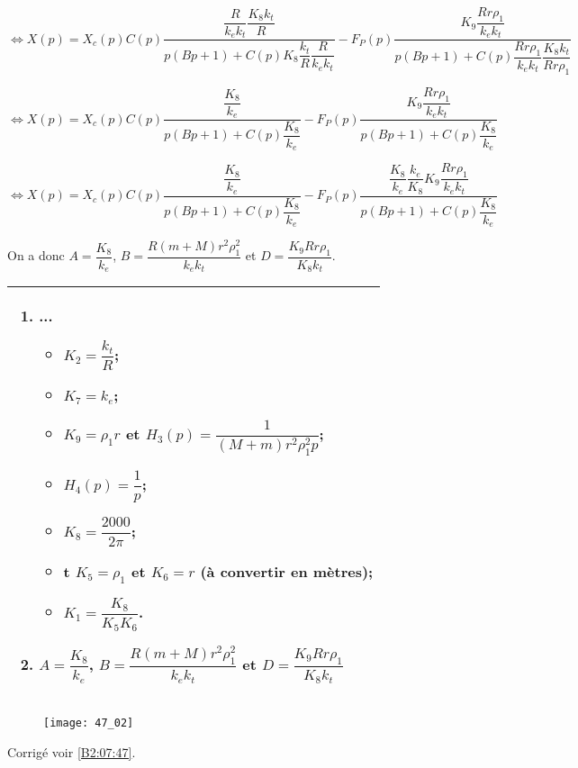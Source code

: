 $\Leftrightarrow X(p)
=
X_c(p) C(p)\dfrac{
\dfrac{R}{k_ek_t}\dfrac{K_8k_t}{R}}{
p\left(B p +  1\right) 
 + C(p)K_8 \dfrac{k_t}{R} \dfrac{R}{k_ek_t}
 }
- F_P(p)\dfrac{K_9\dfrac{Rr\rho_1}{  k_ek_t}}{
p\left(
B  p
 + 1\right)
 + C(p)\dfrac{Rr\rho_1}{  k_ek_t}\dfrac{ K_8 k_t}{Rr\rho_1 } }
$

$\Leftrightarrow X(p)
=
X_c(p) C(p)\dfrac{
\dfrac{K_8}{k_e}}{
p\left(B p +  1\right) 
 + C(p) \dfrac{K_8 }{k_e}
 }
- F_P(p)\dfrac{K_9\dfrac{Rr\rho_1}{  k_ek_t}}{
p\left(
B  p
 + 1\right)
 + C(p)\dfrac{K_8}{  k_e} }
$



$\Leftrightarrow X(p)
=
X_c(p) C(p)\dfrac{
\dfrac{K_8}{k_e}}{
p\left(B p +  1\right) 
 + C(p) \dfrac{K_8 }{k_e}
 }
- F_P(p)\dfrac{ \dfrac{K_8}{  k_e} \dfrac{  k_e}{K_8}K_9\dfrac{Rr\rho_1}{  k_ek_t}}{
p\left(
B  p
 + 1\right)
 + C(p)\dfrac{K_8}{  k_e} }
$



On a donc $A=\dfrac{K_8}{k_e}$, $B=\dfrac{R\left(m+M\right)r^2\rho_1^2}{k_ek_t}$ et 
$D = \dfrac{ K_9 Rr\rho_1}{  K_8k_t}$.
\else
\fi

\ifprof
\else
\footnotesize
\noindent
\begin{tabular}{|p{\linewidth}|}
\hline
\begin{enumerate}
\item ...
\begin{itemize}
\item  $K_2 = \dfrac{k_t}{R}$;
\item $K_7 = k_e$;
\item  $K_9 = \rho_1 r$ et $H_3(p)=\dfrac{1}{\left(M+m\right)r^2\rho_1^2 p}$;
\item   $H_4(p)=\dfrac{1}{p}$; 
\item $K_8  = \dfrac{2000}{2\pi}$;
\item t $K_5=\rho_1$ et $K_6=r$ (à convertir en mètres);
\item  $K_1 =\dfrac{K_8}{K_5 K_6}$.
\end{itemize}
\item $A=\dfrac{K_8}{k_e}$, $B=\dfrac{R\left(m+M\right)r^2\rho_1^2}{k_ek_t}$ et 
$D = \dfrac{ K_9 Rr\rho_1}{  K_8k_t}$
\end{enumerate} \\ \hline
\end{tabular}
\normalsize
\begin{figure}[H]
\centering
\texttt{[image: 47\_02]}
\end{figure}
\fi







\ifprof
\else
\begin{flushright}
\footnotesize{Corrigé  voir \ref{B2:07:47}.}
\end{flushright}%
\fi